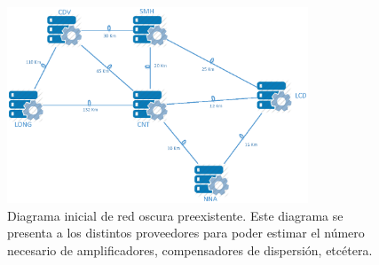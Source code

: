 \begin{figure}[h]
\centering
\includegraphics[width=0.8\textwidth]{Imagenes/Diagrama_Fibra_Oscura.eps}
\caption{Diagrama inicial de red oscura preexistente. Este diagrama se
  presenta a los distintos proveedores para poder estimar el
  número necesario de amplificadores, compensadores de dispersión,
  etcétera.}
\label{fig:diagrama_red}
\end{figure}






